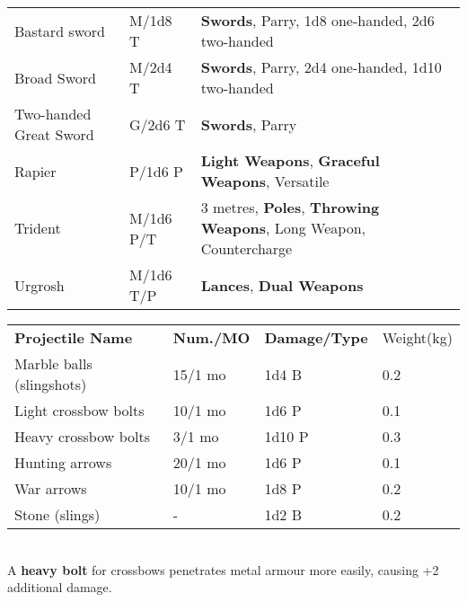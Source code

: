 \documentclass[landscape,10pt,a4paper]{article}
\begin{document}
\begin{multicols}{2}
\begin{dmbox}[title=Weapons - page \pageref{equipmentweapons}]
{\begin{tabularx}{1\linewidth}{lll}
Bastard sword& M/1d8 T&\textbf{Swords}, Parry, 1d8 one-handed, 2d6 two-handed\\
Broad Sword& M/2d4 T&\textbf{Swords}, Parry, 2d4 one-handed, 1d10 two-handed\\
Two-handed Great Sword& G/2d6 T&\textbf{Swords}, Parry\\
Rapier& P/1d6 P& \textbf{Light Weapons}, \textbf{Graceful Weapons}, Versatile\\
Trident& M/1d6 P/T& 3 metres, \textbf{Poles}, \textbf{Throwing Weapons}, Long Weapon, Countercharge\\
Urgrosh& M/1d6 T/P& \textbf{Lances}, \textbf{Dual Weapons}
\end{tabularx}}
\end{dmbox}


\begin{dmbox}[title=Projectiles - page \pageref{projectiles}]

\begin{tabular}{llll}
\textbf{Projectile Name} & \textbf{Num./MO} & \textbf{Damage/Type} & Weight(kg) \\
Marble balls (slingshots) & 15/1 mo & 1d4 B & 0.2 \\
Light crossbow bolts & 10/1 mo & 1d6 P & 0.1 \\
Heavy crossbow bolts & 3/1 mo & 1d10 P & 0.3 \\
Hunting arrows & 20/1 mo & 1d6 P & 0.1 \\
War arrows & 10/1 mo & 1d8 P & 0.2 \\
Stone (slings) & - & 1d2 B & 0.2 \\
\end{tabular}\\

A \textbf{heavy bolt} for crossbows penetrates metal armour more easily, causing +2 additional damage.

\end{dmbox}


\begin{dmbox}[title=Armour - page \pageref{equipmentarmour}]


\end{dmbox}
\end{multicols}
\end{document}
